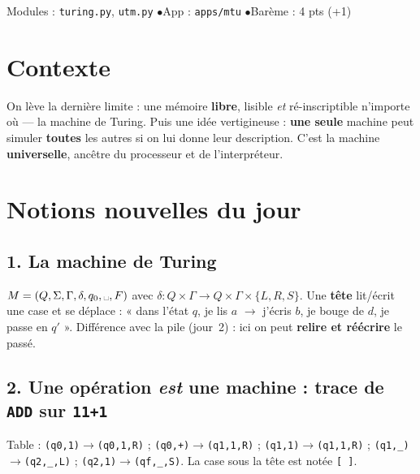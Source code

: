 \documentclass[11pt,a4paper]{scrartcl}
\begin{document}
{Modules : \texttt{turing.py}, \texttt{utm.py} \quad$\bullet$\quad App : \texttt{apps/mtu} \quad$\bullet$\quad Barème : 4 pts (+1)}

\section*{Contexte}
On lève la dernière limite : une mémoire \textbf{libre}, lisible \emph{et}
ré-inscriptible n'importe où — la machine de Turing. Puis une idée vertigineuse :
\textbf{une seule} machine peut simuler \textbf{toutes} les autres si on lui donne leur
description. C'est la machine \textbf{universelle}, ancêtre du processeur et de l'interpréteur.

\section*{Notions nouvelles du jour}

\subsection*{1. La machine de Turing}
$M=(Q,\Sigma,\Gamma,\delta,q_0,\text{\textvisiblespace},F)$ avec
$\delta:Q\times\Gamma\to Q\times\Gamma\times\{L,R,S\}$. Une \textbf{tête} lit/écrit une
case et se déplace : « dans l'état $q$, je lis $a$ $\to$ j'écris $b$, je bouge de $d$, je
passe en $q'$ ». Différence avec la pile (jour~2) : ici on peut \textbf{relire et
réécrire} le passé.

\begin{center}
\end{center}

\subsection*{2. Une opération \emph{est} une machine : trace de \texttt{ADD} sur \texttt{11+1}}
Table : \texttt{(q0,1)$\to$(q0,1,R)} ; \texttt{(q0,+)$\to$(q1,1,R)} ;
\texttt{(q1,1)$\to$(q1,1,R)} ; \texttt{(q1,\_)$\to$(q2,\_,L)} ; \texttt{(q2,1)$\to$(qf,\_,S)}.
La case sous la tête est notée \texttt{[\,]}.
\end{document}
